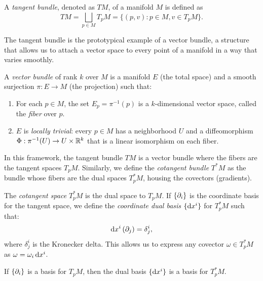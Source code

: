 \begin{definition}
  A \emph{tangent bundle}, denoted as $TM$, of a manifold $M$ is defined as
  \[%
    TM = \bigsqcup_{p \in M} T_pM = \{(p, v) : p \in M, v \in T_pM\}
  .\]%
\end{definition}


The tangent bundle is the prototypical example of a vector bundle, a structure that allows us to attach a vector space to every point of a manifold in a way that varies smoothly.

\begin{definition}
  A \emph{vector bundle} of rank $k$ over $M$ is a manifold $E$ (the total space) and a smooth surjection $\pi : E \to M$ (the projection) such that:
  \begin{enumerate}
    \item For each $p \in M$, the set $E_p = \pi^{-1}(p)$ is a $k$-dimensional vector space, called the \emph{fiber} over $p$.
    \item $E$ is \emph{locally trivial}: every $p \in M$ has a neighborhood $U$ and a diffeomorphism $\Phi : \pi^{-1}(U) \rightarrow U \times \mathbb{R}^k$ that is a linear isomorphism on each fiber.
  \end{enumerate}
\end{definition}

\begin{note}
  In this framework, the tangent bundle $TM$ is a vector bundle where the fibers are the tangent spaces $T_p M$. Similarly, we define the \emph{cotangent bundle} $T^*M$ as the bundle whose fibers are the dual spaces $T^*_p M$, housing the covectors (gradients).
\end{note}

\begin{definition}
  The \emph{cotangent space} $T_p^*M$ is the dual space to $T_pM$. If $\{\pd{i}\}$ is the coordinate basis for the tangent space, we define the \emph{coordinate dual basis} $\{ \dx^i \}$ for $T_p^*M$ such that:
  \[%
    \dx^i \left(\pd{j}\right) = \delta^i_j
  ,\]%
  where $\delta^i_j$ is the Kronecker delta. This allows us to express any covector $\omega \in T_p^*M$ as $\omega = \omega_i \dx^i$.
\end{definition}

\begin{note}
  If $\{\pd{i}\}$ is a basis for $T_pM$, then the dual basis $\{\dx^i\}$ is a basis for $T_p^*M$.
\end{note}

